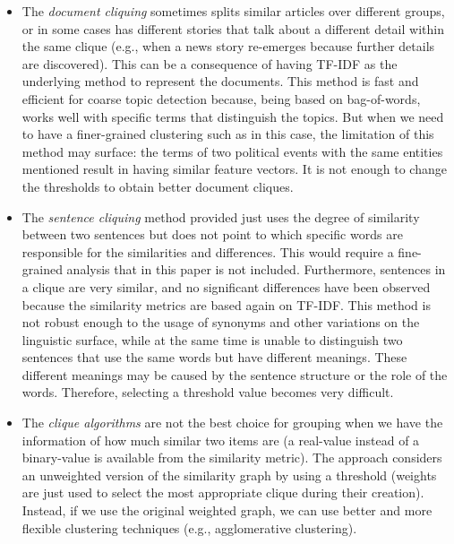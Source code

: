\begin{itemize}
    \item The \emph{document cliquing}
    sometimes splits similar articles over different groups, or in some cases has different stories that talk about a different detail within the same clique (e.g., when a news story re-emerges because further details are discovered).
    This can be a consequence of having TF-IDF as the underlying method to represent the documents.
    This method is fast and efficient for coarse topic detection because, being based on bag-of-words, works well with specific terms that distinguish the topics.
    But when we need to have a finer-grained clustering such as in this case, the limitation of this method may surface: the terms of two political events with the same entities mentioned result in having similar feature vectors.
    It is not enough to change the thresholds to obtain better document cliques.
    \item The \emph{sentence cliquing} method provided just uses the degree of similarity between two sentences but does not point to which specific words are responsible for the similarities and differences. This would require a fine-grained analysis that in this paper is not included. Furthermore, sentences in a clique are very similar, and no significant differences have been observed because the similarity metrics are based again on TF-IDF. This method is not robust enough to the usage of synonyms and other variations on the linguistic surface, while at the same time is unable to distinguish two sentences that use the same words but have different meanings. These different meanings may be caused by the sentence structure or the role of the words. Therefore, selecting a threshold value becomes very difficult.
    \item The \emph{clique algorithms} are not the best choice for grouping when we have the information of how much similar two items are (a real-value instead of a binary-value is available from the similarity metric). The approach considers an unweighted version of the similarity graph by using a threshold (weights are just used to select the most appropriate clique during their creation). Instead, if we use the original weighted graph, we can use better and more flexible clustering techniques (e.g., agglomerative clustering). %
\end{itemize}





